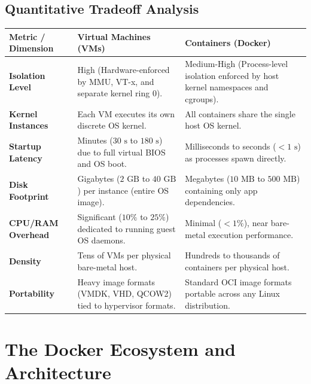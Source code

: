 \subsection{Quantitative Tradeoff Analysis}
\begin{center}
\begin{tabularx}{\textwidth}{>{\bfseries}l X X}
\toprule
Metric / Dimension & Virtual Machines (VMs) & Containers (Docker)\\
\midrule
Isolation Level & High (Hardware-enforced by MMU, VT-x, and separate kernel ring 0). & Medium-High (Process-level isolation enforced by host kernel namespaces and cgroups).\\
Kernel Instances & Each VM executes its own discrete OS kernel. & All containers share the single host OS kernel.\\
Startup Latency & Minutes ($30\text{ s}$ to $180\text{ s}$) due to full virtual BIOS and OS boot. & Milliseconds to seconds ($< 1\text{ s}$) as processes spawn directly.\\
Disk Footprint & Gigabytes ($2\text{ GB}$ to $40\text{ GB}$) per instance (entire OS image). & Megabytes ($10\text{ MB}$ to $500\text{ MB}$) containing only app dependencies.\\
CPU/RAM Overhead & Significant ($10\%$ to $25\%$) dedicated to running guest OS daemons. & Minimal ($< 1\%$), near bare-metal execution performance.\\
Density & Tens of VMs per physical bare-metal host. & Hundreds to thousands of containers per physical host.\\
Portability & Heavy image formats (VMDK, VHD, QCOW2) tied to hypervisor formats. & Standard OCI image formats portable across any Linux distribution.\\
\bottomrule
\end{tabularx}
\end{center}

\section{The Docker Ecosystem and Architecture}
